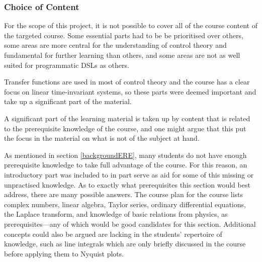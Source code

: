 \subsubsection{Choice of Content}
For the scope of this project, it is not possible to cover all of the course content of the targeted course. Some essential parts had to be be prioritised over others, some areas are more central for the understanding of control theory and fundamental for further learning than others, and some areas are not as well suited for programmatic DSLs as others. 

Transfer functions are used in most of control theory and the course has a clear focus on linear time-invariant systems, so these parts were deemed important and take up a significant part of the material.

A significant part of the learning material is taken up by content that is related to the prerequisite knowledge of the course, and one might argue that this put the focus in the material on what is not of the subject at hand.

As mentioned in section \ref{backgroundERE}, many students do not have enough prerequisite knowledge to take full advantage of the course. For this reason, an introductory part was included to in part serve as aid for some of this missing or unpractised knowledge. As to exactly what prerequisites this section would best address, there are many possible answers. The course plan \cite{ERE103} for the course lists complex numbers, linear algebra, Taylor series, ordinary differential equations, the Laplace transform, and knowledge of basic relations from physics, as prerequisites---any of which would be good candidates for this section. Additional concepts could also be argued are lacking in the students' repertoire of knowledge, such as line integrals which are only briefly discussed in the course before applying them to Nyquist plots. 

